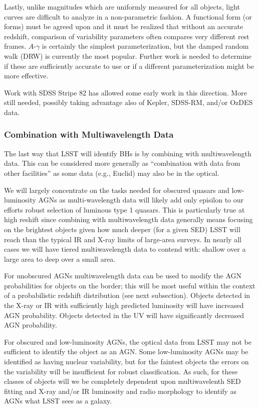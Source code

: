 Lastly, unlike magnitudes which are uniformly measured for all
objects, light curves are difficult to analyze in a non-parametric
fashion.  A functional form (or forms) must be agreed upon and it must
be realized that without an accurate redshift, comparison of
variability parameters often compares very different rest frames.
$A$-$\gamma$ is certainly the simplest parameterization, but the
damped random walk (DRW) is currently the most popular.  Further work
is needed to determine if these are sufficiently accurate to use or if
a different parameterization might be more effective.

Work with SDSS Stripe 82 has allowed some early work in this
direction.  More still needed, possibly taking advantage also of
Kepler, SDSS-RM, and/or OzDES data.


\subsubsection{Combination with Multiwavelength Data}

The last way that LSST will identify BHs is by combining with multiwavelength data.  This can be considered more generally as ``combination with data from other facilities'' as some data (e.g., Euclid) may also be in the optical.

We will largely concentrate on the tasks needed for obscured quasars and low-luminosity AGNs as multi-wavelength data will likely add only episilon to our efforts robust selection of luminous type 1 quasars.  This is particularly true at high reshift since combining with multiwavelength data generally means focusing on the brightest objects given how much deeper (for a given SED) LSST will reach than the typical IR and X-ray limits of large-area surveys.  In nearly all cases we will have tiered multiwavelength data to contend with: shallow over a large area to deep over a small area.

For unobscured AGNs multiwavelength data can be used to modify the AGN probabilities for objects on the border; this will be most useful within the context of a probabilistic redshift distribution (see next subsection).  Objects detected in the X-ray or IR with sufficiently high predicted luminosity will have increased AGN probability.  Objects detected in the UV will have significantly decreased AGN probability.

For obscured and low-luminosity AGNs, the optical data from LSST may not be sufficient to identify the object as an AGN.  Some low-luminosity AGNs may be identified as having nuclear variability, but for the faintest objects the errors on the variability will be insufficient for robust classification.  As such, for these classes of objects will we be completely dependent upon multiwavelenth SED fitting and X-ray and/or IR luminosity and radio morphology to identify as AGNs what LSST sees as a galaxy.

